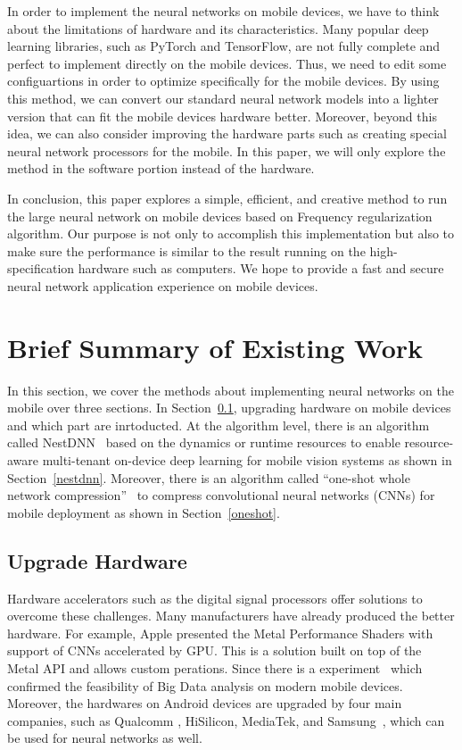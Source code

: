 \documentclass{article}
\begin{document}
In order to implement the neural networks on mobile devices, we have to think about the limitations of hardware and its characteristics. Many popular deep learning libraries, such as PyTorch and TensorFlow, are not fully complete and perfect to implement directly on the mobile devices. Thus, we need to edit some configuartions in order to optimize specifically for the mobile devices. By using this method, we can convert our standard neural network models into a lighter version that can fit the mobile devices hardware better. Moreover, beyond this idea, we can also consider improving the hardware parts such as creating special neural network processors for the mobile. In this paper, we will only explore the method in the software portion instead of the hardware.

In conclusion, this paper explores a simple, efficient, and creative method to run the large neural network on mobile devices based on Frequency regularization algorithm. Our purpose is not only to accomplish this implementation but also to make sure the performance is similar to the result running on the high-specification hardware such as computers. We hope to provide a fast and secure neural network application experience on mobile devices.


\section*{Brief Summary of Existing Work}

In this section, we cover the methods about implementing neural networks on the mobile over three sections. In Section~\ref{upgrade_hardware}, upgrading hardware on mobile devices and which part are inrtoducted. At the algorithm level, there is an algorithm called NestDNN~\cite{fang2018nestdnn} based on the dynamics or runtime resources to enable resource-aware multi-tenant on-device deep learning for mobile vision systems as shown in Section~\ref{nestdnn}. Moreover, there is an algorithm called “one-shot whole network compression”~\cite{kim2016compression} to compress convolutional neural networks (CNNs) for mobile deployment as shown in Section~\ref{oneshot}.

\subsection{Upgrade Hardware}\label{upgrade_hardware}
Hardware accelerators such as the digital signal processors offer solutions to overcome these challenges. Many manufacturers have already produced the better hardware. For example, Apple presented the Metal Performance Shaders with support of CNNs accelerated by GPU. This is a solution built on top of the Metal API and allows custom perations. Since there is a experiment~\cite{akusok2019metal} which confirmed the feasibility of Big Data analysis on modern mobile devices. Moreover, the hardwares on Android devices are upgraded by four main companies, such as Qualcomm , HiSilicon, MediaTek, and Samsung~\cite{Andrey2019Aibenchmark}, which can be used for neural networks as well.
\end{document}
